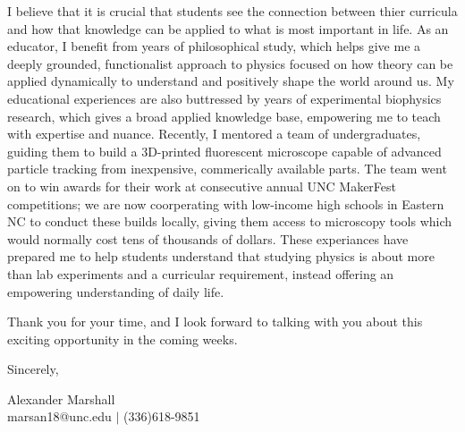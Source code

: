 I believe that it is crucial that students see the connection between thier curricula and how that knowledge can be applied to what is most important in life. As an educator, I benefit from years of philosophical study, which helps give me a deeply grounded, functionalist approach to physics focused on how theory can be applied dynamically to understand and positively shape the world around us. My educational experiences are also buttressed by years of experimental biophysics research, which gives a broad applied knowledge base, empowering me to teach with expertise and nuance. Recently, I mentored a team of undergraduates, guiding them to build a 3D-printed fluorescent microscope capable of advanced particle tracking from inexpensive, commerically available parts. The team went on to win awards for their work at consecutive annual UNC MakerFest competitions; we are now coorperating with low-income high schools in Eastern NC to conduct these builds locally, giving them access to microscopy tools which would normally cost tens of thousands of dollars. These experiances have prepared me to help students understand that studying physics is about more than lab experiments and a curricular requirement, instead offering an empowering understanding of daily life.\par

Thank you for your time, and I look forward to talking with you about this exciting opportunity in the coming weeks.\par

Sincerely, \par
Alexander Marshall\\ %
marsan18@unc.edu $\vert$ (336)618-9851

\newpage
